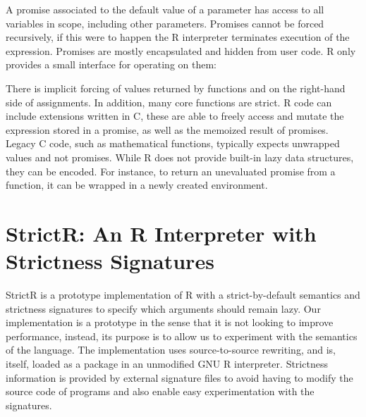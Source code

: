 \documentclass[screen,acmsmall]{acmart}
\renewcommand{\c}[1]{\lstinline |#1|\xspace}
\newcommand{\strictr}{{\sf StrictR}\xspace}
\begin{document}
A promise associated to the default value of a parameter has access to all
variables in scope, including other parameters. Promises cannot be forced
recursively, if this were to happen the R interpreter terminates execution of
the expression. Promises are mostly encapsulated and hidden from user code. R
only provides a small interface for operating on them:


There is implicit forcing of values returned by functions and on the
right-hand side of assignments. In addition, many core functions are strict. R
code can include extensions written in C, these are able to freely access and
mutate the expression stored in a promise, as well as the memoized result of
promises. Legacy C code, such as mathematical functions, typically expects
unwrapped values and not promises. While R does not provide built-in lazy data
structures, they can be encoded. For instance, to return an
unevaluated promise from a function, it can be wrapped in a newly created
environment.

\section{StrictR: An R Interpreter with Strictness Signatures}\label{sec:strictr}

\strictr is a prototype implementation of R with a strict-by-default semantics
and strictness signatures to specify which arguments should remain lazy. Our
implementation is a prototype in the sense that it is not looking to improve
performance, instead, its purpose is to allow us to experiment with the
semantics of the language. The implementation uses source-to-source rewriting,
and is, itself, loaded as a package in an unmodified GNU R interpreter.
Strictness information is provided by external signature files to avoid having
to modify the source code of programs and also enable easy experimentation with
the signatures.
\end{document}
